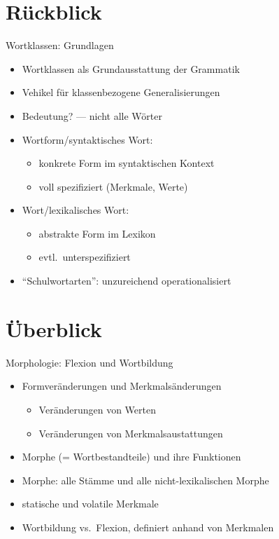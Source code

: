 
\section{Rückblick}

\begin{frame}
  {Wortklassen: Grundlagen}
  \pause
  \begin{itemize}[<+->]
    \item Wortklassen als \alert{Grundausstattung der Grammatik}
    \item Vehikel für klassenbezogene Generalisierungen
    \item Bedeutung? --- nicht alle Wörter
      \Zeile
    \item Wortform\slash syntaktisches Wort:
      \begin{itemize}[<+->]
        \item konkrete Form \alert{im syntaktischen Kontext}
        \item voll spezifiziert (Merkmale, Werte)
      \end{itemize}
      \Zeile
    \item Wort\slash lexikalisches Wort:
      \begin{itemize}[<+->]
        \item abstrakte Form \alert{im Lexikon}
        \item evtl.\ unterspezifiziert
      \end{itemize}
      \Zeile
    \item "`Schulwortarten"': \alert{unzureichend operationalisiert}
  \end{itemize}
\end{frame}

\section{Überblick}

\begin{frame}
  {Morphologie: Flexion und Wortbildung}
  \pause
  \begin{itemize}[<+->]
    \item \alert{Formveränderungen} und \alert{Merkmalsänderungen}
      \begin{itemize}[<+->]
        \item Veränderungen von Werten
        \item Veränderungen von Merkmalsaustattungen
      \end{itemize}
      \Halbzeile
    \item Morphe (= Wortbestandteile) und ihre Funktionen
    \item Morphe: alle Stämme und alle nicht-lexikalischen Morphe
      \Halbzeile
    \item statische und volatile Merkmale
    \item Wortbildung vs.\ Flexion, definiert anhand von Merkmalen
  \end{itemize}
\end{frame}

